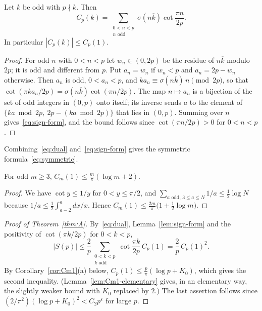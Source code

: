 \begin{lemma}\label{lem:sign-form}
Let $k$ be odd with $p\nmid k$. Then
\begin{equation}\label{eq:sign-form}
C_p(k)=\sum_{\substack{0<n<p\\ n\text{ odd}}}\sigma(n\overline k)\cot\frac{\pi n}{2p}.
\end{equation}
In particular $|C_p(k)|\le C_p(1)$.
\end{lemma}

\begin{proof}
For odd $n$ with $0<n<p$ let $w_n\in(0,2p)$ be the residue of $n\overline k$ modulo $2p$; it is odd and different from $p$. Put $a_n=w_n$ if $w_n<p$ and $a_n=2p-w_n$ otherwise. Then $a_n$ is odd, $0<a_n<p$, and $ka_n\equiv\sigma(n\overline k)\,n\pmod{2p}$, so that $\cot(\pi ka_n/2p)=\sigma(n\overline k)\cot(\pi n/2p)$. The map $n\mapsto a_n$ is a bijection of the set of odd integers in $(0,p)$ onto itself; its inverse sends $a$ to the element of $\{ka\bmod2p,\ 2p-(ka\bmod2p)\}$ that lies in $(0,p)$. Summing over $n$ gives~\eqref{eq:sign-form}, and the bound follows since $\cot(\pi n/2p)>0$ for $0<n<p$.
\end{proof}

Combining~\eqref{eq:dual} and~\eqref{eq:sign-form} gives the symmetric formula~\eqref{eq:symmetric}.

\begin{lemma}\label{lem:Cm1-elementary}
For odd $m\ge3$, $C_m(1)\le\frac m\pi(\log m+2)$.
\end{lemma}

\begin{proof}
We have $\cot y\le1/y$ for $0<y\le\pi/2$, and $\sum_{a\text{ odd},\,3\le a\le N}1/a\le\frac12\log N$ because $1/a\le\frac12\int_{a-2}^a dx/x$. Hence $C_m(1)\le\frac{2m}\pi\bigl(1+\frac12\log m\bigr)$.
\end{proof}

\begin{proof}[Proof of Theorem~\ref{thm:A}]
By~\eqref{eq:dual}, Lemma~\ref{lem:sign-form} and the positivity of $\cot(\pi k/2p)$ for $0<k<p$,
\[
|S(p)|\le\frac2p\sum_{\substack{0<k<p\\ k\text{ odd}}}\cot\frac{\pi k}{2p}\,C_p(1)=\frac2p\,C_p(1)^2.
\]
By Corollary~\ref{cor:Cm1}(a) below, $C_p(1)\le\frac p\pi(\log p+K_0)$, which gives the second inequality. (Lemma~\ref{lem:Cm1-elementary} gives, in an elementary way, the slightly weaker bound with $K_0$ replaced by $2$.) The last assertion follows since $(2/\pi^2)(\log p+K_0)^2<C_2p^\varepsilon$ for large $p$.
\end{proof}

